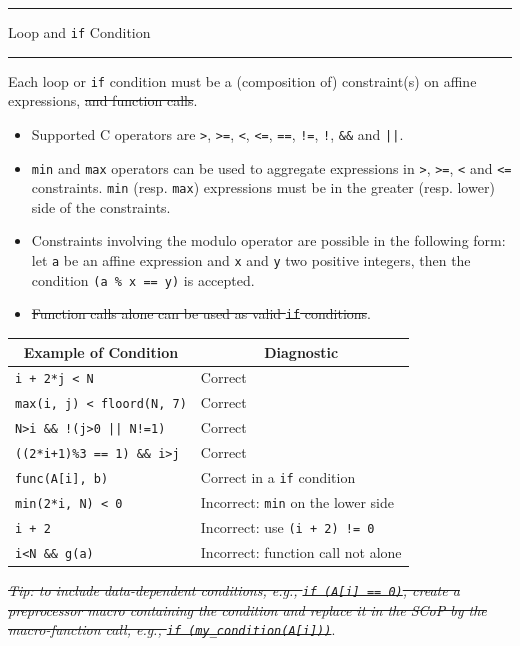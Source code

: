 \documentclass[landscape,a4paper]{article}
\def\titre#1{\begin{center}\hrule\vspace{0.1cm}#1
\vspace{0.07cm}\hrule\end{center}}
\begin{document}
\begin{multicols}{3}
\titre{Loop and {\tt if} Condition}

\begin{small}
Each loop or {\tt if} condition must be a (composition of) constraint(s) on
affine expressions, \sout{and function calls}.
\begin{itemize} %
\item Supported C operators are {\tt >}, {\tt >=}, {\tt <}, {\tt <=},
      {\tt ==}, {\tt !=}, {\tt !}, {\tt \&\&} and {\tt ||}.
\item {\tt min} and {\tt max} operators can be used to aggregate expressions
      in {\tt >}, {\tt >=}, {\tt <} and {\tt <=} constraints. {\tt min}
      (resp. {\tt max}) expressions must be in the greater (resp. lower)
      side of the constraints.
\item Constraints involving the modulo operator are possible in the following
      form: let {\tt a} be an affine expression and {\tt x} and {\tt y} two
      positive integers, then the condition {\tt (a \% x == y)} is accepted.
\item \sout{Function calls alone can be used as valid {\tt if} conditions}.
\end{itemize}

\vspace{0.3cm}
\begin{tabular}{p{4cm}|p{4.39cm}}
\multicolumn{1}{c|}{Example of Condition} &\multicolumn{1}{c}{Diagnostic}\\
\hline
{\tt i + 2*j < N} & Correct\\
\hline
{\tt max(i, j) < floord(N, 7)} & Correct\\
\hline
{\tt N>i \&\& !(j>0 || N!=1)} & Correct\\
\hline
{\tt ((2*i+1)\%3 == 1) \&\& i>j} & Correct\\
\hline
{\tt func(A[i], b)} & Correct in a {\tt if} condition\\
\hline
\hline
{\tt min(2*i, N) < 0} & Incorrect: {\tt min} on the lower side\\
\hline
{\tt i + 2} & Incorrect: use {\tt (i + 2) != 0}\\
\hline
{\tt i<N \&\& g(a)} & Incorrect: function call not alone
\end{tabular}

\vspace{0.3cm}
\textit{\sout{Tip: to include data-dependent conditions, e.g.,
{\tt if (A[i] == 0)}, create a preprocessor macro containing
the condition and replace it in the SCoP by the macro-function call,
e.g., {\tt if (my\_condition(A[i]))}}}.
\end{small}


\end{multicols}
\end{document}
